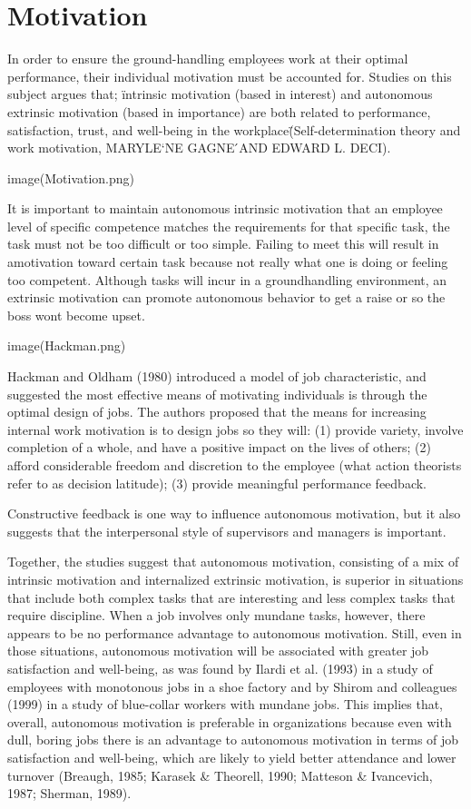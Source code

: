 \section{Motivation}

In order to ensure the ground-handling employees work at their optimal performance, their individual motivation must be accounted for. Studies on this subject argues that; \"intrinsic motivation (based in interest) and autonomous extrinsic motivation (based in importance) are both related to performance, satisfaction, trust, and well-being in the workplace\" (Self-determination theory and work motivation, MARYLE`NE GAGNE ́AND EDWARD L. DECI).

image(Motivation.png)

It is important to maintain autonomous intrinsic motivation that an employee level of specific competence matches the requirements for that specific task, the task must not be too difficult or too simple. Failing to meet this will result in amotivation toward certain task because not really what one is doing or feeling too competent. Although tasks will incur in a groundhandling environment, an extrinsic motivation can promote autonomous behavior to get a raise or so the boss wont become upset.

image(Hackman.png)

Hackman and Oldham (1980) introduced a model of job characteristic, and suggested the most effective means of motivating individuals is through the optimal design of jobs.
The authors proposed that the means for increasing internal work motivation is to design jobs so they will:
(1) provide variety, involve completion of a whole, and have a positive impact on the lives of others;
(2) afford considerable freedom and discretion to the employee (what action theorists refer to as decision latitude); 
(3) provide meaningful performance feedback.

Constructive feedback is one way to inﬂuence autonomous motivation, but it also suggests that the interpersonal style of supervisors and managers is important.

Together, the studies suggest that autonomous motivation, consisting of a mix of intrinsic motivation and internalized extrinsic motivation, is superior in situations that include both complex tasks that are interesting and less complex tasks that require discipline. When a job involves only mundane tasks, however, there appears to be no performance advantage to autonomous motivation. Still, even in those situations, autonomous motivation will be associated with greater job satisfaction and well-being, as was found by Ilardi et al. (1993) in a study of employees with monotonous jobs in a shoe factory and by Shirom and colleagues (1999) in a study of blue-collar workers with mundane jobs. This implies that, overall, autonomous motivation is preferable in organizations because even with dull, boring jobs there is an advantage to autonomous motivation in terms of job satisfaction and well-being, which are likely to yield better attendance and lower turnover (Breaugh, 1985; Karasek & Theorell, 1990; Matteson & Ivancevich, 1987; Sherman, 1989).


